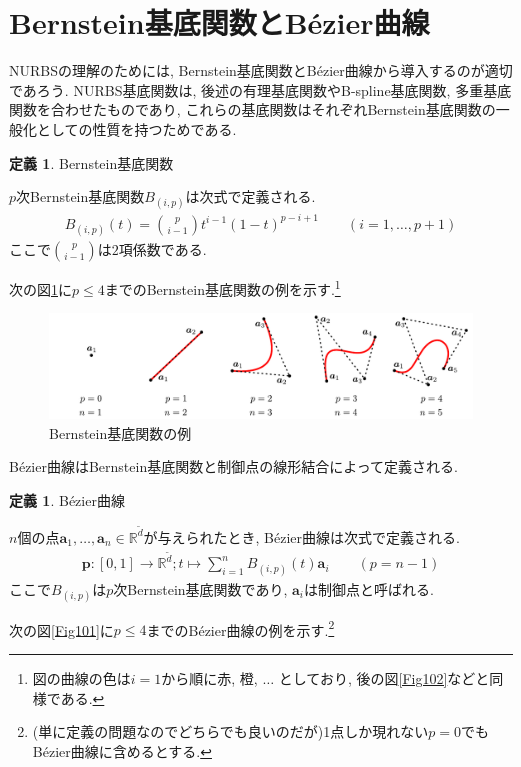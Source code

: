 \documentclass{jsarticle}
\newcommand\setR{\mathbb{R}}
\newcommand\nCr[2]{\binom{#1}{#2}}
\theoremstyle{definition}%
\newtheorem{defn}[thm]{定義}
\begin{document}
\section{Bernstein基底関数とB\'{e}zier曲線}
NURBSの理解のためには, Bernstein基底関数とB\'{e}zier曲線から導入するのが適切であろう.
NURBS基底関数は, 後述の有理基底関数やB-spline基底関数, 多重基底関数を合わせたものであり, これらの基底関数はそれぞれBernstein基底関数の一般化としての性質を持つためである.
\begin{screen}
	\begin{defn}
        \label{Def101}
		Bernstein基底関数

		$p$次Bernstein基底関数$B_{(i,p)}$は次式で定義される.
		\begin{align}
			\label{Eqn101}
			B_{(i,p)}(t)=\nCr{p}{i-1}t^{i-1}(1-t)^{p-i+1} \qquad (i=1,\dots,p+1)
		\end{align}
		ここで$\nCr{p}{i-1}$は$2$項係数である.
	\end{defn}
\end{screen}
次の図\ref{Fig104}に$p\le 4$までのBernstein基底関数の例を示す.\footnote{図の曲線の色は$i=1$から順に赤, 橙, $\dots$ としており, 後の図\ref{Fig102}などと同様である.}
\addtocounter{footnote}{-1}
\begin{figure}[htbp]
	\centering
    \includegraphics[page=10,clip,width=160mm]{fig.pdf}
	\caption{Bernstein基底関数の例\protect\footnotemark}
	\label{Fig104}
\end{figure}

\noindent B\'{e}zier曲線はBernstein基底関数と制御点の線形結合によって定義される.
\begin{screen}
	\begin{defn}
		B\'ezier曲線

		$n$個の点$\bm{a}_1, \dots, \bm{a}_n\in\mathbb{R}^{\tilde{d}}$が与えられたとき, B\'ezier曲線は次式で定義される.
		\begin{align}
			\label{Eqn102}
			\bm{p}:[0,1]\to \setR^{\tilde{d}};t\mapsto \sum_{i=1}^nB_{(i,p)}(t)\bm{a}_i \qquad (p=n-1)
		\end{align}
        ここで$B_{(i,p)}$は$p$次Bernstein基底関数であり, $\bm{a}_i$は制御点と呼ばれる.
	\end{defn}
\end{screen}
次の図\ref{Fig101}に$p\le 4$までのB\'ezier曲線の例を示す.\footnote{(単に定義の問題なのでどちらでも良いのだが)1点しか現れない$p=0$でもB\'{e}zier曲線に含めるとする.}
\newpage
\end{document}

